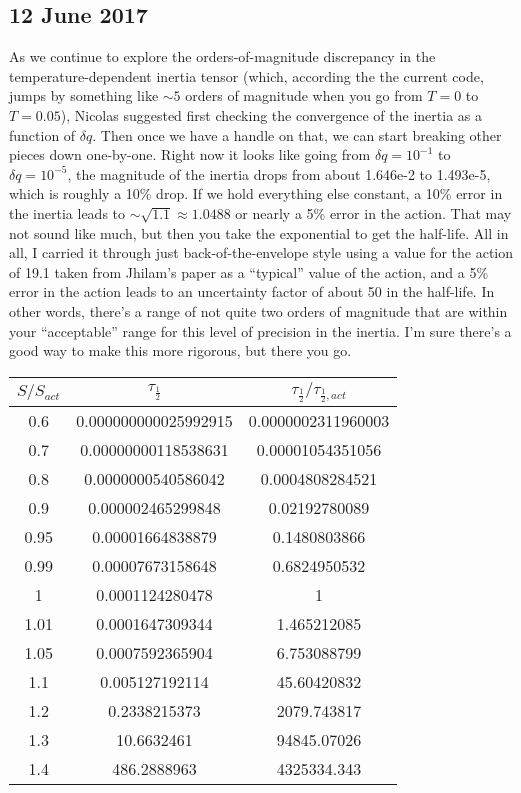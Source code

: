 \documentclass[]{report}
\begin{document}
\subsection*{12 June 2017}
As we continue to explore the orders-of-magnitude discrepancy in the temperature-dependent inertia tensor (which, according the the current code, jumps by something like $\sim 5$ orders of magnitude when you go from $T=0$ to $T=0.05$), Nicolas suggested first checking the convergence of the inertia as a function of $\delta q$. Then once we have a handle on that, we can start breaking other pieces down one-by-one. Right now it looks like going from $\delta q=10^{-1}$ to $\delta q=10^{-5}$, the magnitude of the inertia drops from about 1.646e-2 to 1.493e-5, which is roughly a 10\% drop. If we hold everything else constant, a 10\% error in the inertia leads to $\sim\sqrt{1.1}\approx1.0488$ or nearly a 5\% error in the action. That may not sound like much, but then you take the exponential to get the half-life. All in all, I carried it through just back-of-the-envelope style using a value for the action of 19.1 taken from Jhilam's paper as a ``typical'' value of the action, and a 5\% error in the action leads to an uncertainty factor of about 50 in the half-life. In other words, there's a range of not quite two orders of magnitude that are within your ``acceptable'' range for this level of precision in the inertia. I'm sure there's a good way to make this more rigorous, but there you go.

\begin{tabular}{ccc}
$S/S_{act}$ & $\tau_\frac{1}{2}$ & $\tau_\frac{1}{2}/\tau_{\frac{1}{2},act}$
\\ \hline
0.6 &	0.000000000025992915 &	0.0000002311960003 \\
0.7 &	0.00000000118538631 &	0.00001054351056 \\
0.8 &	0.0000000540586042 &	0.0004808284521 \\
0.9 &	0.000002465299848 &	0.02192780089 \\
0.95 &	0.00001664838879 &	0.1480803866 \\
0.99 &	0.00007673158648 &	0.6824950532 \\
1 &	0.0001124280478 &	1 \\
1.01 &	0.0001647309344 &	1.465212085 \\
1.05 &	0.0007592365904 &	6.753088799 \\
1.1 &	0.005127192114 &	45.60420832 \\
1.2 &	0.2338215373 &	2079.743817 \\
1.3 &	10.6632461 &	94845.07026 \\
1.4 &	486.2888963 &	4325334.343 \\


\end{tabular}
\end{document}
